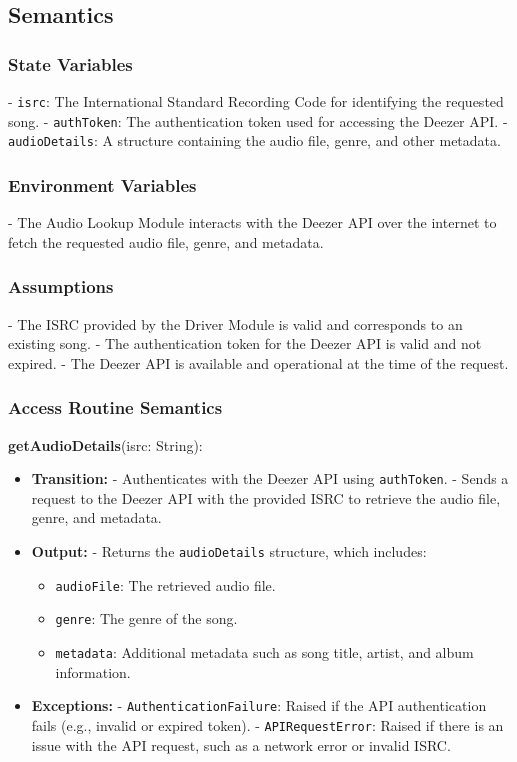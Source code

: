 \documentclass[12pt, titlepage]{article}
\begin{document}
\subsection{Semantics}

\subsubsection{State Variables}
- \texttt{isrc}: The International Standard Recording Code for identifying the requested song.
- \texttt{authToken}: The authentication token used for accessing the Deezer API.
- \texttt{audioDetails}: A structure containing the audio file, genre, and other metadata.

\subsubsection{Environment Variables}
- The Audio Lookup Module interacts with the Deezer API over the internet to fetch the requested audio file, genre, and metadata.

\subsubsection{Assumptions}
- The ISRC provided by the Driver Module is valid and corresponds to an existing song.
- The authentication token for the Deezer API is valid and not expired.
- The Deezer API is available and operational at the time of the request.

\subsubsection{Access Routine Semantics}

\noindent \textbf{getAudioDetails}(isrc: String):
\begin{itemize}
\item \textbf{Transition:} 
    - Authenticates with the Deezer API using \texttt{authToken}.
    - Sends a request to the Deezer API with the provided ISRC to retrieve the audio file, genre, and metadata.
\item \textbf{Output:} 
    - Returns the \texttt{audioDetails} structure, which includes:
      \begin{itemize}
        \item \texttt{audioFile}: The retrieved audio file.
        \item \texttt{genre}: The genre of the song.
        \item \texttt{metadata}: Additional metadata such as song title, artist, and album information.
      \end{itemize}
\item \textbf{Exceptions:} 
    - \texttt{AuthenticationFailure}: Raised if the API authentication fails (e.g., invalid or expired token).
    - \texttt{APIRequestError}: Raised if there is an issue with the API request, such as a network error or invalid ISRC.
\end{itemize}
\end{document}
